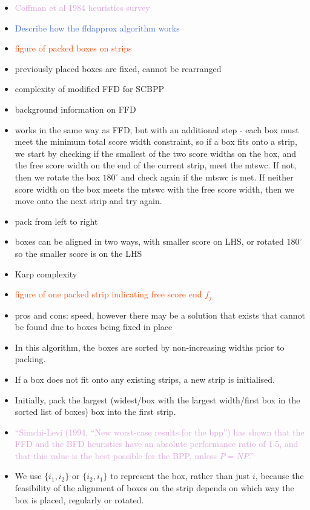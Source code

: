 \documentclass{llncs}
\begin{document}
\begin{itemize}
	\item \textcolor{Plum}{Coffman et al 1984 heuristics survey}
	\item \textcolor{RoyalBlue}{Describe how the ffdapprox algorithm works}
	\item \textcolor{OrangeRed}{figure of packed boxes on strips}
	\item previously placed boxes are fixed, cannot be rearranged
	\item complexity of modified FFD for SCBPP
	\item background information on FFD
	\item works in the same way as FFD, but with an additional step - each box must meet the minimum total score width constraint, so if a box fits onto a strip, we start by checking if the smallest of the two score widths on the box, and the free score width on the end of the current strip, meet the mtswc. If not, then we rotate the box $180^{\circ}$ and check again if the mtswc is met. If neither score width on the box meets the mtswc with the free score width, then we move onto the next strip and try again.
	\item pack from left to right
	\item boxes can be aligned in two ways, with smaller score on LHS, or rotated $180^{\circ}$ so the smaller score is on the LHS
	\item Karp complexity
	\item \textcolor{OrangeRed}{figure of one packed strip indicating free score end $f_j$}
	\item pros and cons: speed, however there may be a solution that exists that cannot be found due to boxes being fixed in place
	\item In this algorithm, the boxes are sorted by non-increasing widths prior to packing.
	\item If a box does not fit onto any existing strips, a new strip is initialised.
	\item Initially, pack the largest (widest/box with the largest width/first box in the sorted list of boxes) box into the first strip.
	\item \textcolor{Plum}{``Simchi-Levi (1994, ``New worst-case results for the bpp'') has shown that the FFD and the BFD heuristics have an absolute performance ratio of 1.5, and that this value is the best possible for the BPP, unless $P = NP$.''}
	\item We use $\{i_1, i_2\}$ or $\{i_2, i_1\}$ to represent the box, rather than just $i$, because the feasibility of the alignment of boxes on the strip depends on which way the box is placed, regularly or rotated.
\end{itemize}
\end{document}
